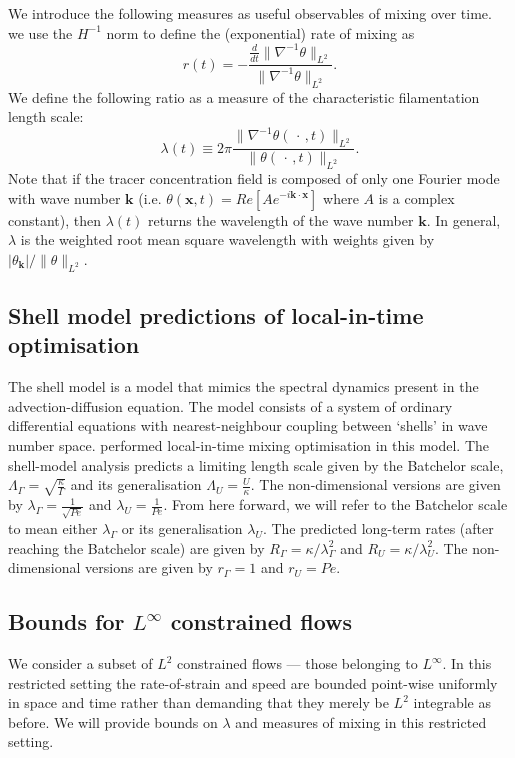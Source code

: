 \documentclass[12pt]{iopart}
\newcommand{\ddt}[1]{\frac{d #1}{dt}}
\newcommand{\hmone}[1]{\|\nabla^{-1} #1\|_{L^{2}}}
\newcommand{\ltwo}[1]{\|#1\|_{L^{2}}}
\renewcommand{\vec}[1]{\mathbf{#1}}
\begin{document}
We introduce the following measures as useful observables of mixing over time. we use the $H^{-1}$ norm to define the (exponential) rate of mixing as
\begin{equation}
\label{eq:rate}
r(t) = -  \frac{\ddt{}\hmone{\theta}}{\hmone{\theta}}.
\end{equation}
We define the following ratio as a measure of the characteristic filamentation length scale:
\begin{equation}
\lambda(t)\equiv  2\pi \frac{\|\nabla^{-1}\theta(\,\cdot\,,t)\|_{L^{2}}}{\|\theta(\,\cdot\,,t)\|_{L^{2}}}.
\end{equation}
Note that if the tracer concentration field is composed of only one Fourier mode with wave number $\vec{k}$ (i.e. $\theta(\vec{x},t) = Re[ A e^{-i\vec{k}\cdot \vec{x}}]$ where $A$ is a complex constant), then $\lambda(t)$ returns the wavelength of the wave number $\vec{k}$. In general, $\lambda$ is the weighted root mean square wavelength with weights given by $|\theta_{\vec{k}}|/\ltwo{\theta}$. 


\subsection{Shell model predictions of local-in-time optimisation}

The shell model is a model that mimics the spectral dynamics present in the advection-diffusion equation. The model consists of a system of ordinary differential equations with nearest-neighbour coupling between `shells' in wave number space. \cite{Miles2017a} performed local-in-time mixing optimisation in this model. The shell-model analysis predicts a limiting length scale given by the Batchelor scale, $\Lambda_{\Gamma} =\sqrt{\frac{\kappa}{\Gamma}}$  and its generalisation $\Lambda_{U}= \frac{U}{\kappa} $. The non-dimensional versions are given by $\lambda_{\Gamma}= \frac{1}{\sqrt{Pe}}$ and $\lambda_{U} = \frac{1}{Pe}$. From here forward, we will refer to the Batchelor scale to mean either $\lambda_{\Gamma}$ or its generalisation $\lambda_{U}$.  The predicted long-term rates (after reaching the Batchelor scale) are given by $R_{\Gamma} =\kappa/\lambda_{\Gamma}^2 $  and  $R_{U}=\kappa/\lambda_{U}^2$.  The non-dimensional versions are given by $r_{\Gamma} =1$ and $r_{U} = Pe $.

\subsection{Bounds for $L^{\infty}$ constrained flows}
We consider a subset of $L^{2}$ constrained flows --- those belonging to $L^{\infty}$. In this restricted setting the rate-of-strain and speed are bounded point-wise uniformly in space and time rather than demanding that they merely be $L^2$ integrable as before. We will provide bounds on $\lambda$ and measures of mixing in this restricted setting. 
\end{document}
